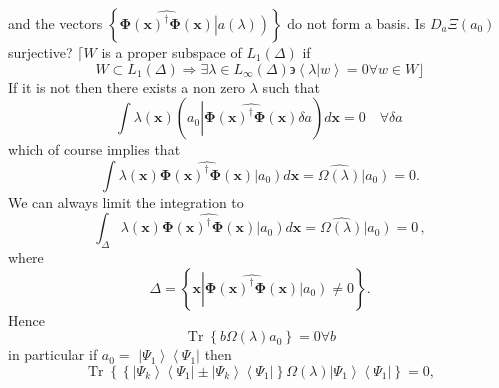 \documentclass[aps,preprint]{revtex4}%
\begin{document}
and the vectors $\left\{  \widehat{\mathbf{\Phi}\left(  \mathbf{x}\right)
^{\dagger}\mathbf{\Phi}\left(  \mathbf{x}\right)  }\left\vert \overset
{}{a\left(  \lambda\right)  }\right)  \right\}  $ do not form a basis. Is
$D_{a}\Xi\left(  a_{0}\right)  $ surjective? $\lceil W$ is a proper subspace
of $L_{1}\left(  \Delta\right)  $ if
\begin{equation}
W\subset L_{1}\left(  \Delta\right)  \Rightarrow\exists\lambda\in L_{\infty
}\left(  \Delta\right)  \backepsilon\left\langle \left.  \lambda\right\vert
w\right\rangle =0\forall w\in W\rfloor
\end{equation}
If it is not then there exists a non zero $\lambda$ such that
\begin{equation}
\int\lambda\left(  \mathbf{x}\right)  \left(  a_{0}\left\vert \widehat
{\mathbf{\Phi}\left(  \mathbf{x}\right)  ^{\dagger}\mathbf{\Phi}\left(
\mathbf{x}\right)  }\right.  \delta a\right)  d\mathbf{x}=0\quad\forall\delta
a\,
\end{equation}
which of course implies that
\begin{equation}
\int\lambda\left(  \mathbf{x}\right)  \widehat{\mathbf{\Phi}\left(
\mathbf{x}\right)  ^{\dagger}\mathbf{\Phi}\left(  \mathbf{x}\right)
}\left\vert \overset{}{a_{0}}\right)  d\mathbf{x}=\widehat{\Omega\left(
\lambda\right)  }\left\vert \overset{}{a_{0}}\right)  =0.
\end{equation}
We can always limit the integration to
\begin{equation}
\int_{\Delta}\lambda\left(  \mathbf{x}\right)  \widehat{\mathbf{\Phi}\left(
\mathbf{x}\right)  ^{\dagger}\mathbf{\Phi}\left(  \mathbf{x}\right)
}\left\vert \overset{}{a_{0}}\right)  d\mathbf{x}=\widehat{\Omega\left(
\lambda\right)  }\left\vert \overset{}{a_{0}}\right)  =0\,,
\end{equation}
where
\begin{equation}
\Delta=\left\{  \mathbf{x}\left\vert \widehat{\mathbf{\Phi}\left(
\mathbf{x}\right)  ^{\dagger}\mathbf{\Phi}\left(  \mathbf{x}\right)
}\left\vert \overset{}{a_{0}}\right)  \neq0\right.  \right\}  .
\end{equation}
Hence
\begin{equation}
\operatorname{Tr}\left\{  b\Omega\left(  \lambda\right)  a_{0}\right\}
=0\forall b
\end{equation}
in particular if $a_{0}=$ $\left\vert \Psi_{1}\right\rangle \left\langle
\Psi_{1}\right\vert $ then
\begin{equation}
\operatorname{Tr}\left\{  \left\{  \left\vert \Psi_{k}\right\rangle
\left\langle \Psi_{1}\right\vert \pm\left\vert \Psi_{k}\right\rangle
\left\langle \Psi_{1}\right\vert \right\}  \Omega\left(  \lambda\right)
\left\vert \Psi_{1}\right\rangle \left\langle \Psi_{1}\right\vert \right\}
=0,
\end{equation}
\end{document}

